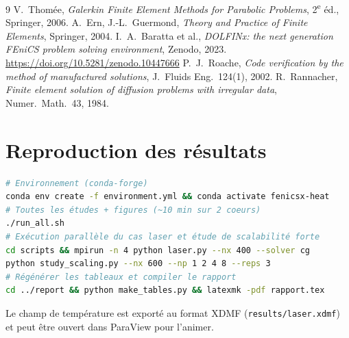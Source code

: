 \documentclass[11pt,a4paper]{article}
\begin{document}
\begin{thebibliography}{9}
 V.~Thomée, \emph{Galerkin Finite Element Methods for Parabolic Problems}, 2\textsuperscript{e} éd., Springer, 2006.
 A.~Ern, J.-L.~Guermond, \emph{Theory and Practice of Finite Elements}, Springer, 2004.
 I.~A.~Baratta et al., \emph{DOLFINx: the next generation FEniCS problem solving environment}, Zenodo, 2023. \url{https://doi.org/10.5281/zenodo.10447666}
 P.~J.~Roache, \emph{Code verification by the method of manufactured solutions}, J.~Fluids Eng.~124(1), 2002.
 R.~Rannacher, \emph{Finite element solution of diffusion problems with irregular data}, Numer.~Math.~43, 1984.
\end{thebibliography}

\appendix
\section{Reproduction des résultats}\label{app:repro}
\begin{lstlisting}[language=bash]
# Environnement (conda-forge)
conda env create -f environment.yml && conda activate fenicsx-heat
# Toutes les études + figures (~10 min sur 2 coeurs)
./run_all.sh
# Exécution parallèle du cas laser et étude de scalabilité forte
cd scripts && mpirun -n 4 python laser.py --nx 400 --solver cg
python study_scaling.py --nx 600 --np 1 2 4 8 --reps 3
# Régénérer les tableaux et compiler le rapport
cd ../report && python make_tables.py && latexmk -pdf rapport.tex
\end{lstlisting}
Le champ de température est exporté au format XDMF (\texttt{results/laser.xdmf}) et peut être ouvert
dans ParaView pour l'animer.
\end{document}
